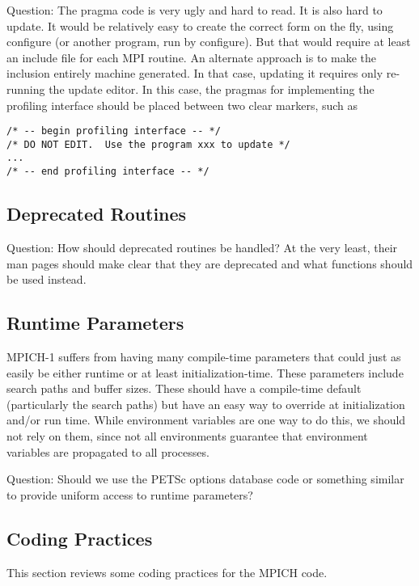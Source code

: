 \documentclass{article}
\begin{document}
Question: The pragma code is very ugly and hard to read.  It is also hard to
update.
It would be relatively
easy to create the correct form on the fly, using configure (or
another program, run by configure).  But that
would require at least an include file for each MPI routine.
An alternate approach is to make the inclusion entirely machine
generated.  In that case, updating it requires only re-running the
update editor.  In this case, the pragmas for implementing the
profiling interface should be placed between two clear markers, such
as 
\begin{verbatim}
/* -- begin profiling interface -- */
/* DO NOT EDIT.  Use the program xxx to update */
...
/* -- end profiling interface -- */
\end{verbatim}

\subsection{Deprecated Routines}
Question:  How should deprecated routines be handled?  At the very
least, their man pages should make clear that they are deprecated and
what functions should be used instead.

\subsection{Runtime Parameters}
MPICH-1 suffers from having many compile-time parameters that could just as
easily be either runtime or at least initialization-time.  These parameters
include search paths and buffer sizes.  These should have a compile-time
default (particularly the search paths) but have an easy way to override at
initialization and/or run time.  While environment variables are one way to do
this, we should not rely on them, since not all environments guarantee that
environment variables are propagated to all processes.

Question: Should we use the PETSc options database code or something similar
to provide uniform access to runtime parameters?  

\subsection{Coding Practices}
This section reviews some coding practices for the MPICH code.
\end{document}

